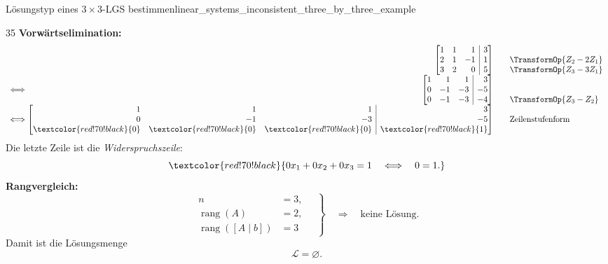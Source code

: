 \begin{ExampleBox}{Lösungstyp eines $3\times3$-LGS bestimmen}{linear_systems_inconsistent_three_by_three_example}
  \begin{ClozeArea}[32]{35}
    \textbf{Vorwärtselimination:}
    \[
      \begin{array}{r@{\;}r@{\qquad}l}
        &\left[\begin{array}{@{}rrr|r@{}}
          1&1&1&3\\
          2&1&-1&1\\
          3&2&0&5
        \end{array}\right]
        &\begin{array}{@{}l@{}}
          {}\\
          \smash{\TransformOp{Z_2-2Z_1}}\\
          \smash{\TransformOp{Z_3-3Z_1}}
        \end{array}\\[1.0em]
        \Longleftrightarrow
        &\left[\begin{array}{@{}rrr|r@{}}
          1&1&1&3\\
          0&-1&-3&-5\\
          0&-1&-3&-4
        \end{array}\right]
        &\begin{array}{@{}l@{}}
          {}\\
          {}\\
          \smash{\TransformOp{Z_3-Z_2}}
        \end{array}\\[1.0em]
        \Longleftrightarrow
        &\left[\begin{array}{@{}rrr|r@{}}
          1&1&1&3\\
          0&-1&-3&-5\\
          \textcolor{red!70!black}{0}&\textcolor{red!70!black}{0}&
          \textcolor{red!70!black}{0}&\textcolor{red!70!black}{1}
        \end{array}\right]
        &\text{Zeilenstufenform}
      \end{array}
    \]
    Die letzte Zeile ist die
    \textcolor{red!70!black}{\emph{Widerspruchszeile}}:
    \[
      \textcolor{red!70!black}{
        0x_1+0x_2+0x_3=1
        \quad\Longleftrightarrow\quad
        0=1.
      }
    \]
    \textbf{Rangvergleich:}
    \[
      \left.
      \begin{aligned}
        n&=3,\\[0.5em]
        \operatorname{rang}(A)&=2,\\[0.5em]
        \operatorname{rang}([A\mid b])&=3
      \end{aligned}
      \quad\right\}
      \quad\Longrightarrow\quad
      \text{keine Lösung}.
    \]
    Damit ist die Lösungsmenge
    \[
      \mathcal L=\varnothing.
    \]
  \end{ClozeArea}
\end{ExampleBox}

